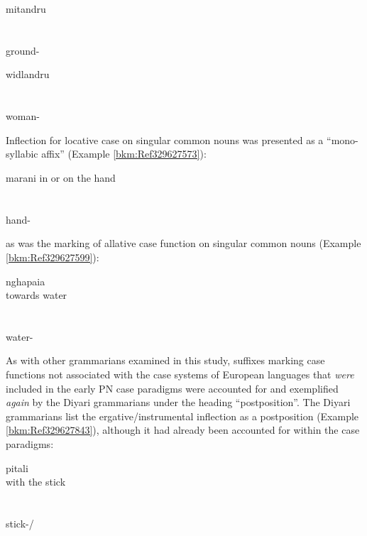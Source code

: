 \ea\label{bkm:Ref329627527}
mitandru 
\\
\\
\citep[52]{flierl_dieri_1880} \\
\glt ground-
\z

\ea\label{bkm:Ref329627545}
widlandru 
\\
\\
\citep[52]{flierl_dieri_1880}\\
\glt woman-
\z

Inflection for locative case on singular common nouns was presented as a “mono-syllabic affix” (Example \ref{bkm:Ref329627573}):

\ea\label{bkm:Ref329627573}
marani {in or on the hand}\\
\\
\citep[52]{flierl_dieri_1880} \\
\glt hand-\\
\z

as was the marking of allative case function on singular common nouns (Example \ref{bkm:Ref329627599}):

\ea\label{bkm:Ref329627599}
\gll nghapaia \\
{towards water} \\
\glt \citep[52]{flierl_dieri_1880} \\
\\
water-\\
\z

As with other grammarians examined in this study, suffixes marking case functions not associated with the case systems of European languages that \textit{were} included in the early PN case paradigms were accounted for and exemplified \textit{again} by the Diyari grammarians under the heading ``postposition''. The Diyari grammarians list the ergative/instrumental inflection as a postposition (Example \ref{bkm:Ref329627843}), although it had already been accounted for within the case paradigms:

\ea
\label{bkm:Ref329627843}
\gll pitali \\
{with the stick} \\
\glt \citep[52]{flierl_dieri_1880} \\
\\
stick-/\\
\z


